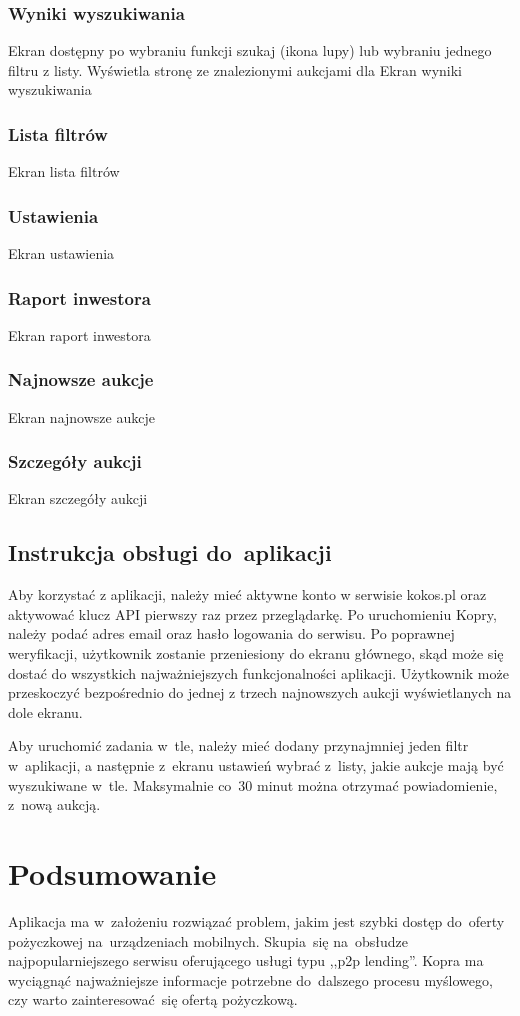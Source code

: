 \documentclass[a4paper,twoside,titlepage,openright]{book}
\begin{document}
\subsection{Wyniki wyszukiwania}
Ekran dostępny po wybraniu funkcji szukaj (ikona lupy) lub wybraniu jednego filtru z listy. Wyświetla stronę ze znalezionymi aukcjami dla 
{\color{red}Ekran wyniki wyszukiwania}
\subsection{Lista filtrów}
{\color{red}Ekran lista filtrów}
\subsection{Ustawienia}
{\color{red}Ekran ustawienia}
\subsection{Raport inwestora}
{\color{red}Ekran raport inwestora}
\subsection{Najnowsze aukcje}
{\color{red}Ekran najnowsze aukcje}
\subsection{Szczegóły aukcji}
{\color{red}Ekran szczegóły aukcji}
\section{Instrukcja obsługi do~aplikacji}
Aby korzystać z aplikacji, należy mieć aktywne konto w serwisie kokos.pl oraz aktywować klucz API pierwszy raz przez przeglądarkę. Po uruchomieniu Kopry, należy podać adres email oraz hasło logowania do serwisu. Po poprawnej weryfikacji, użytkownik zostanie przeniesiony do ekranu głównego, skąd może się dostać do wszystkich najważniejszych funkcjonalności aplikacji. Użytkownik może przeskoczyć bezpośrednio do jednej z trzech najnowszych aukcji wyświetlanych na dole ekranu.

Aby uruchomić zadania w~tle, należy mieć dodany przynajmniej jeden filtr w~aplikacji, a następnie z~ekranu ustawień wybrać z~listy, jakie aukcje mają być wyszukiwane w~tle. Maksymalnie co~30 minut można otrzymać powiadomienie, z~nową aukcją.

 
\chapter{Podsumowanie}
Aplikacja ma w~założeniu rozwiązać problem, jakim jest szybki dostęp do~oferty pożyczkowej na~urządzeniach mobilnych. Skupia~się na~obsłudze najpopularniejszego serwisu oferującego usługi typu ,,p2p lending''. Kopra ma wyciągnąć najważniejsze informacje potrzebne do~dalszego procesu myślowego, czy warto zainteresować~się ofertą pożyczkową. 
\end{document}
